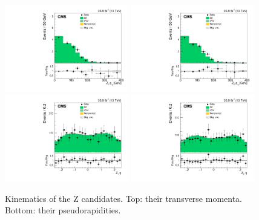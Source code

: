 \begin{figure}[!b]
\centering
\includegraphics[width=0.48\textwidth]{figures/dibosons/zz4l/pTZ1.pdf}
\includegraphics[width=0.48\textwidth]{figures/dibosons/zz4l/pTZ2.pdf}
\includegraphics[width=0.48\textwidth]{figures/dibosons/zz4l/etaZ1.pdf}
\includegraphics[width=0.48\textwidth]{figures/dibosons/zz4l/etaZ2.pdf}
\caption{Kinematics of the Z candidates. Top: their transverse momenta. Bottom: their pseudorapidities.
\label{fig:zz4l_zpt}}
\end{figure}

